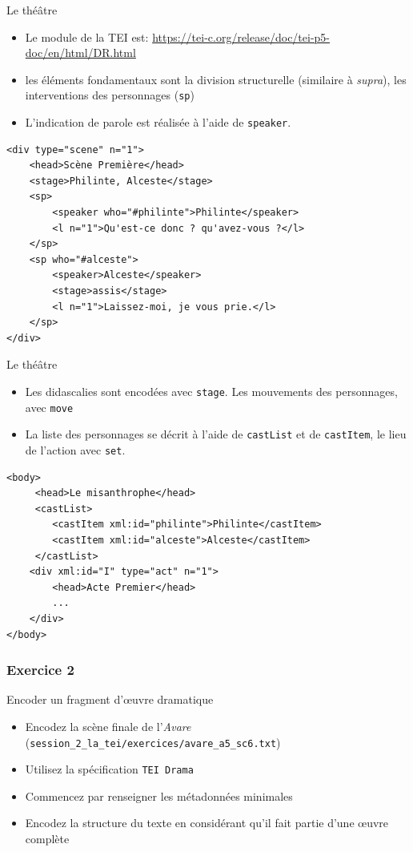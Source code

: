 \documentclass[11pt,aspectratio=1610]{beamer}
\begin{document}
\begin{frame}[containsverbatim]{Le théâtre}
\begin{itemize}
\item Le module de la TEI est: \href{Performance texts}{https://tei-c.org/release/doc/tei-p5-doc/en/html/DR.html}
\item les éléments fondamentaux sont la division structurelle (similaire à \textit{supra}), les interventions des personnages (\texttt{sp})
\item L'indication de parole est réalisée à l'aide de \texttt{speaker}.
\end{itemize}
\begin{verbatim}
<div type="scene" n="1">
    <head>Scène Première</head>
    <stage>Philinte, Alceste</stage>
    <sp>
        <speaker who="#philinte">Philinte</speaker>
        <l n="1">Qu'est-ce donc ? qu'avez-vous ?</l>
    </sp>
    <sp who="#alceste">
        <speaker>Alceste</speaker>
        <stage>assis</stage>
        <l n="1">Laissez-moi, je vous prie.</l>
    </sp>
</div>
\end{verbatim}
\end{frame}



\begin{frame}[containsverbatim]{Le théâtre}
\begin{itemize}
\item Les didascalies sont encodées avec \texttt{stage}. Les mouvements des personnages, avec \texttt{move}
\item La liste des personnages se décrit à l'aide de \texttt{castList} et de \texttt{castItem}, le lieu de l'action avec \texttt{set}.
\end{itemize}
\begin{verbatim}
<body>
     <head>Le misanthrophe</head>
     <castList>
        <castItem xml:id="philinte">Philinte</castItem>
        <castItem xml:id="alceste">Alceste</castItem>
     </castList>
    <div xml:id="I" type="act" n="1">
        <head>Acte Premier</head>
        ...
    </div>
</body>
\end{verbatim}
\end{frame}

\subsubsection{Exercice 2}
\begin{frame}{Encoder un fragment d'\oe uvre dramatique}
\begin{itemize}
\item Encodez la scène finale de l'\textit{Avare} (\texttt{session\_2\_la\_tei/exercices/avare\_a5\_sc6.txt})
\item Utilisez la spécification \texttt{TEI Drama}
\item Commencez par renseigner les métadonnées minimales
\item Encodez la structure du texte en considérant qu'il fait partie d'une \oe uvre complète
\end{itemize}
\end{frame}


\end{document}
